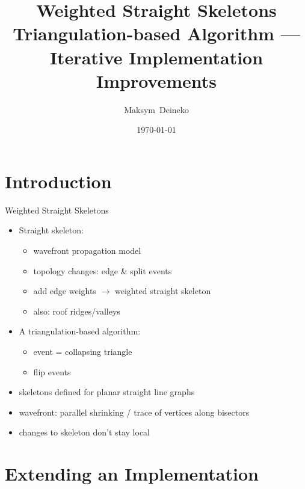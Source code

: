 \documentclass[
  size=9pt,
  style=klope,
  paper=screen,
  mode=print,
  display=slides,
  nohandoutpagebreaks,
  pauseslide,
  hlsections,
  fleqn,
  dvips,
  clock
]{powerdot}
\title{%
  \vspace{21pt}
  Weighted Straight Skeletons
  \\[12pt]
  {\normalsize Triangulation-based Algorithm --- Iterative Implementation Improvements}
}
\author{%
  Maksym~Deineko \\ {\small \mailto{deineko@student.tugraz.at} }
}
\date{\today}
\begin{document}
\maketitle
{}

\section[template=wideslide]{Introduction}

\begin{slide}{Weighted Straight Skeletons}
  \begin{itemize}
    \item Straight skeleton:
    \begin{itemize}
      \item wavefront propagation model
      \item topology changes: edge \& split events
      \item add edge weights $\rightarrow$ weighted straight skeleton
      \item also: roof ridges/valleys
    \end{itemize}
    \item A triangulation-based algorithm:
    \begin{itemize}
      \item event = collapsing triangle
      \item flip events
    \end{itemize}
  \end{itemize}
\end{slide}
\begin{note}{}
  \begin{itemize}
    \item skeletons defined for planar straight line graphs
    \item wavefront: parallel shrinking / trace of vertices along bisectors
    \item changes to skeleton don't stay local
  \end{itemize}
\end{note}

\section[template=wideslide]{Extending an Implementation}
\end{document}
